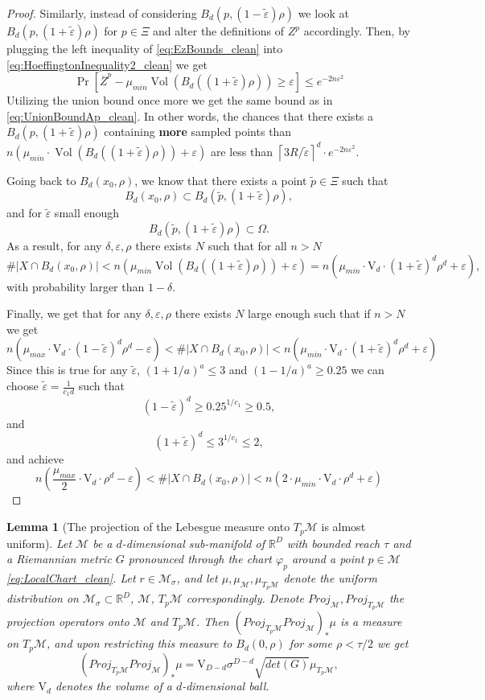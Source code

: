 \documentclass[12pt]{article}
\newtheorem{Lemma}[Theorem]{Lemma}
\theoremstyle{remark}
\newcommand{\RR}{\mathbb{R}}
\newcommand{\MM}{\mathcal{M}}
\newcommand{\eps}{\varepsilon}
\newcommand{\ceil}[1]{\left\lceil #1 \right\rceil}
\DeclareMathOperator{\vol}{Vol}
\begin{document}
\begin{appendices}
\begin{proof}
Similarly, instead of considering $B_d(p, (1-\tilde\eps)\rho)$ we look at $B_d(p, (1+\tilde\eps)\rho)$ for $p\in\Xi$ and alter the definitions of $Z^p$ accordingly.
Then, by plugging the left inequality of \eqref{eq:EzBounds_clean} into \eqref{eq:HoeffingtonInequality2_clean} we get
\[
\Pr[\overline{Z}^p - \mu_{min}\vol(B_d((1+\tilde\eps)\rho))\geq \eps] \leq e^{-2n\eps^2} 
\]
Utilizing the union bound once more we get the same bound as in \eqref{eq:UnionBoundAp_clean}. 
In other words, the chances that there exists a $B_d(p, (1+\tilde\eps)\rho)$ containing \textbf{more} sampled points than $n(\mu_{min} \cdot \vol(B_d((1+\tilde\eps)\rho)) + \eps )$ are less than $\ceil{3R/\tilde\eps}^d\cdot e^{-2n\eps^2}$.

Going back to $B_d(x_0, \rho)$, we know that there exists a point $\tilde p\in \Xi$ such that 
\[
B_d(x_0, \rho) \subset B_d(\tilde p,(1+\tilde\eps)\rho)
,\]
and for $\tilde\eps$ small enough
\[
B_d(\tilde p,(1+\tilde\eps)\rho) \subset \Omega
.\]
As a result, for any $\delta, \eps, \rho$ there exists $N$ such that for all $n>N$
\[
\#|X \cap B_d(x_0, \rho)| < n(\mu_{min}\vol(B_d((1+\tilde\eps)\rho))+\eps)
= n(\mu_{min}\cdot \mathrm{V}_d \cdot(1+\tilde\eps)^d\rho^d+\eps)
,\]
with probability larger than $1-\delta$.

Finally, we get that for any $\delta, \eps, \rho$ there exists $N$ large enough such that if $n>N$ we get
\[
n(\mu_{max}\cdot \mathrm{V}_d \cdot(1-\tilde\eps)^d\rho^d-\eps) < \#|X \cap B_d(x_0, \rho)| < n(\mu_{min}\cdot \mathrm{V}_d \cdot(1+\tilde\eps)^d\rho^d+\eps)
\]
Since this is true for any $\tilde\eps$, $(1+1/a)^a \leq 3$ and $(1-1/a)^a \geq 0.25$ we can choose $\tilde\eps = \frac{1}{c_1 d}$ such that
\[(1 - \tilde\eps)^d \geq 0.25^{1/c_1} \geq 0.5,\]
and
\[(1 + \tilde\eps)^d \leq 3^{1/c_1} \leq 2,\]
and achieve
\[
n(\frac{\mu_{max}}{2}\cdot \mathrm{V}_d \cdot\rho^d-\eps) < \#|X \cap B_d(x_0, \rho)| < n(2\cdot \mu_{min}\cdot \mathrm{V}_d \cdot\rho^d+\eps)
\]
\end{proof}

\begin{Lemma}[The projection of the Lebesgue measure onto $T_p\MM$ is almost uniform] \label{lem:measure_projecting_to_tangent_clean}
    Let $\MM$ be a $d$-dimensional sub-manifold of $\RR^D$ with bounded reach $\tau$ and a Riemannian metric $G$ pronounced through the chart $\varphi_p$ around a point $ p\in \MM $ \eqref{eq:LocalChart_clean}. 
    Let $r\in\MM_\sigma$, and let $\mu, \mu_\MM, \mu_{T_p\MM}$ denote the uniform distribution on $\MM_\sigma\subset\RR^D$, $\MM$, $T_p\MM$ correspondingly.
    Denote $Proj_\MM, Proj_{T_p\MM}$ the projection operators onto $\MM$ and $T_p\MM$.
    Then $\left(Proj_{T_p\MM}Proj_{\MM}\right)_*\mu$ is a measure on $T_p\MM$, and upon restricting this measure to $B_d(0,\rho)$ for some $\rho < \tau/2$ we get
    \[
    (Proj_{T_p\MM}Proj_\MM)_*\mu = \mathrm{V}_{D-d}\sigma^{D-d} \sqrt{det(G)}\mu_{T_p\MM}
    ,\]
    where $\mathrm{V}_d$ denotes the volume of a $d$-dimensional ball.
\end{Lemma}


\end{appendices}
\end{document}
